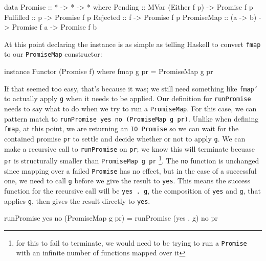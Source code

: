 \documentclass[12pt, english, letterpaper]{kuthesis}
\newcommand{\lit}[1]{\texttt{#1}}
\begin{document}
\begin{code}
data Promise :: * -> * -> * where
    Pending :: MVar (Either f p) -> Promise f p
    Fulfilled :: p -> Promise f p
    Rejected :: f -> Promise f p
    PromiseMap :: (a -> b) -> Promise f a -> Promise f b
\end{code}

At this point declaring the instance is as simple as telling Haskell to convert \lit{fmap} to our \lit{PromiseMap} constructor:
\begin{code}
instance Functor (Promise f) where
    fmap g pr = PromiseMap g pr
\end{code}
If that seemed too easy, that's because it was; we still need something like \lit{fmap'} to actually apply \lit g when it needs to be applied.  Our definition for \lit{runPromise} needs to say what to do when we try to run a \lit{PromiseMap}.  For this case, we can pattern match to \lit{runPromise yes no (PromiseMap g pr)}.  Unlike when defining \lit{fmap}, at this point, we are returning an \lit{IO Promise} so we can wait for the contained promise \lit{pr} to settle and decide whether or not to apply \lit g.  We can make a recursive call to \lit{runPromise} on \lit{pr}; we know this will terminate becuase \lit{pr} is structurally smaller than \lit{PromiseMap g pr} \footnote{for this to fail to terminate, we would need to be trying to run a \lit{Promise} with an infinite number of functions mapped over it}.  The \lit{no} function is unchanged since mapping over a failed \lit{Promise} has no effect, but in the case of a successful one, we need to call \lit g before we give the result to \lit{yes}.  This means the success function for the recursive call will be \lit{yes . g}, the composition of \lit{yes} and \lit g, that applies \lit g, then gives the result directly to \lit{yes}.
\begin{code}
runPromise yes no (PromiseMap g pr) = runPromise (yes . g) no pr
\end{code}
\end{document}
